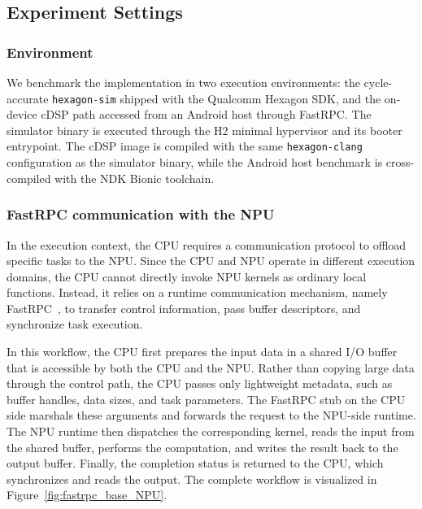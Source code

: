 

\subsection{Experiment Settings}

\subsubsection{Environment}
We benchmark the implementation in two execution environments: the
cycle-accurate \texttt{hexagon-sim} shipped with the Qualcomm Hexagon SDK, and
the on-device cDSP path accessed from an Android host through FastRPC. The
simulator binary is executed through the H2 minimal hypervisor and its booter
entrypoint. The cDSP image is compiled with the same \texttt{hexagon-clang}
configuration as the simulator binary, while the Android host benchmark is
cross-compiled with the NDK Bionic toolchain.


\subsubsection{ FastRPC communication with the NPU}
In the execution context, the CPU requires a communication protocol to offload specific tasks to the NPU. Since the CPU and NPU operate in different execution domains, the CPU cannot directly invoke NPU kernels as ordinary local functions. Instead, it relies on a runtime communication mechanism, namely FastRPC~\cite{Qua18HexagonDSP}, to transfer control information, pass buffer descriptors, and synchronize task execution.

In this workflow, the CPU first prepares the input data in a shared I/O buffer that is accessible by both the CPU and the NPU. Rather than copying large data through the control path, the CPU passes only lightweight metadata, such as buffer handles, data sizes, and task parameters. The FastRPC stub on the CPU side marshals these arguments and forwards the request to the NPU-side runtime. The NPU runtime then dispatches the corresponding kernel, reads the input from the shared buffer, performs the computation, and writes the result back to the output buffer. Finally, the completion status is returned to the CPU, which synchronizes and reads the output. The complete workflow is visualized in Figure~\ref{fig:fastrpc_base_NPU}.

